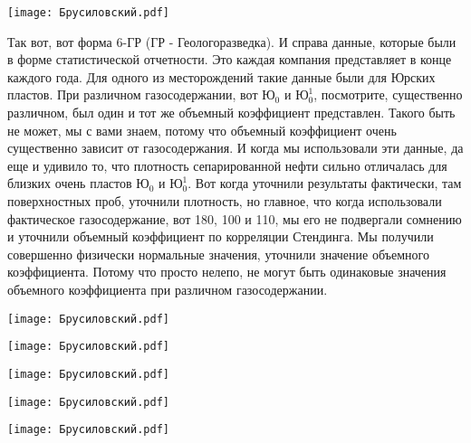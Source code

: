 \documentclass[main.tex]{subfiles}
\begin{document}
\begin{center}
\texttt{[image: Брусиловский.pdf]}
\end{center}

Так вот, вот форма 6-ГР (ГР - Геологоразведка).
И справа данные, которые были в форме статистической отчетности.
Это каждая компания представляет в конце каждого года.
Для одного из месторождений такие данные были для Юрских пластов.
При различном газосодержании, вот $\text{Ю}_0$ и $\text{Ю}_0^1$, посмотрите, существенно различном, был один и тот же объемный коэффициент представлен.
Такого быть не может, мы с вами знаем, потому что объемный коэффициент очень существенно зависит от газосодержания.
И когда мы использовали эти данные, да еще и удивило то, что плотность сепарированной нефти сильно отличалась для близких очень пластов $\text{Ю}_0$ и $\text{Ю}_0^1$.
Вот когда уточнили результаты фактически, там поверхностных проб, уточнили плотность, но главное, что когда использовали фактическое газосодержание, вот 180, 100 и 110, мы его не подвергали сомнению и уточнили объемный коэффициент по корреляции Стендинга.
Мы получили совершенно физически нормальные значения, уточнили значение объемного коэффициента.
Потому что просто нелепо, не могут быть одинаковые значения объемного коэффициента при различном газосодержании.

\begin{center}
\texttt{[image: Брусиловский.pdf]}
\end{center}



\begin{center}
\texttt{[image: Брусиловский.pdf]}
\end{center}



\begin{center}
\texttt{[image: Брусиловский.pdf]}
\end{center}



\begin{center}
\texttt{[image: Брусиловский.pdf]}
\end{center}



\begin{center}
\texttt{[image: Брусиловский.pdf]}
\end{center}
\end{document}
